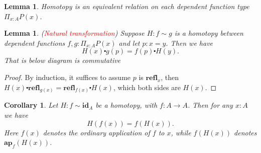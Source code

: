 \documentclass{article}
\newtheorem{lemma}[theorem]{Lemma}
\newtheorem{corollary}[theorem]{Corollary}
\newcommand{\redt}[1]{\textcolor{red}{#1}}
\newcommand{\refl}{\textbf{refl}}
\newcommand{\id}{\textbf{id}}
\newcommand{\ap}{\textbf{ap}}
\begin{document}
\begin{lemma}
\rm Homotopy is an equivalent relation on each dependent function type $\Pi_{x:A} P(x)$.
\end{lemma}

\begin{lemma}
\rm (\redt{Natural transformation}) Suppose $H : f \sim g$ is a homotopy between dependent functions $f,g: \Pi_{x:A} P(x)$ and let $p : x=y$. Then we have 
\[
    H(x) \centerdot g(p) = f(p) \centerdot H(y).
\]
That is below diagram is commutative
\begin{center}
\end{center}
\end{lemma}

\begin{proof}
\rm By induction, it suffices to assume $p$ is $\refl_x$, then $H(x) \centerdot \refl_{g(x)} = \refl_{f(x)} \centerdot H(x)$, which both sides are $H(x)$.
\end{proof}

\begin{corollary}
\rm Let $H : f \sim \id_A$ be a homotopy, with $f : A \to A$. Then for any $x : A$ we have 
\[
    H(f(x)) = f(H(x)).
\]
Here $f(x)$ denotes the ordinary application of $f$ to $x$, while $f(H(x))$ denotes $\ap_f(H(x))$.
\end{corollary}
\end{document}
